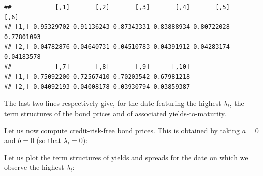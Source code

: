 \documentclass[
  12pt,
]{book}
\newenvironment{Shaded}{\begin{snugshade}}{\end{snugshade}}
\newcommand{\AttributeTok}[1]{\textcolor[rgb]{0.13,0.29,0.53}{#1}}
\newcommand{\DecValTok}[1]{\textcolor[rgb]{0.00,0.00,0.81}{#1}}
\newcommand{\FloatTok}[1]{\textcolor[rgb]{0.00,0.00,0.81}{#1}}
\newcommand{\FunctionTok}[1]{\textcolor[rgb]{0.13,0.29,0.53}{\textbf{#1}}}
\newcommand{\NormalTok}[1]{#1}
\newcommand{\OtherTok}[1]{\textcolor[rgb]{0.56,0.35,0.01}{#1}}
\newcommand{\SpecialCharTok}[1]{\textcolor[rgb]{0.81,0.36,0.00}{\textbf{#1}}}
\theoremstyle{definition}
\theoremstyle{definition}
\theoremstyle{definition}
\theoremstyle{definition}
\theoremstyle{remark}
\begin{document}
\begin{verbatim}
##            [,1]       [,2]       [,3]       [,4]       [,5]       [,6]
## [1,] 0.95329702 0.91136243 0.87343331 0.83888934 0.80722028 0.77801093
## [2,] 0.04782876 0.04640731 0.04510783 0.04391912 0.04283174 0.04183578
##            [,7]       [,8]       [,9]      [,10]
## [1,] 0.75092200 0.72567410 0.70203542 0.67981218
## [2,] 0.04092193 0.04008178 0.03930794 0.03859387
\end{verbatim}

The last two lines respectively give, for the date featuring the highest \(\lambda_t\), the term structures of the bond prices and of associated yields-to-maturity.

Let us now compute credit-risk-free bond prices. This is obtained by taking \(a=0\) and \(b=0\) (so that \(\lambda_t=0\)):

\begin{Shaded}
\end{Shaded}

Let us plot the term structures of yields and spreads for the date on which we observe the highest \(\lambda_t\):
\end{document}
